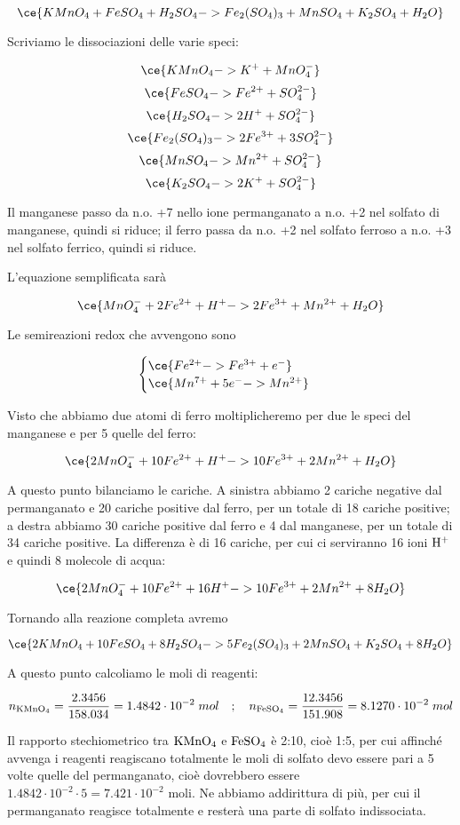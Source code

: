 $$\ce{KMnO_4 + FeSO_4 + H_2SO_4 -> Fe_2(SO_4)_3 + MnSO_4 + K_2SO_4 + H_2O}$$

Scriviamo le dissociazioni delle varie speci:

$$\ce{KMnO_4 -> K^+ + MnO_4^-}$$
$$\ce{FeSO_4 -> Fe^{2+} + SO_4^{2-}}$$
$$\ce{H_2SO_4 -> 2H^+ + SO_4^{2-}}$$
$$\ce{Fe_2(SO_4)_3 -> 2Fe^{3+} + 3SO_4^{2-}}$$
$$\ce{MnSO_4 -> Mn^{2+} + SO_4^{2-}}$$
$$\ce{K_2SO_4 -> 2K^+ + SO_4^{2-}}$$

Il manganese passo da n.o. +7 nello ione permanganato a n.o. +2 nel solfato di manganese, quindi si riduce; il ferro passa da n.o. +2 nel solfato ferroso a n.o. +3 nel solfato ferrico, quindi si riduce.

L'equazione semplificata sarà

$$\ce{MnO_4^- + 2Fe^{2+} + H^+ -> 2Fe^{3+} + Mn^{2+} + H_2O}$$

Le semireazioni redox che avvengono sono

$$\begin{cases}
    \ce{Fe^{2+} -> Fe^{3+} + e^-}\\
    \ce{Mn^{7+} + 5e^- -> Mn^{2+}}
\end{cases}$$

Visto che abbiamo due atomi di ferro moltiplicheremo per due le speci del manganese e per 5 quelle del ferro:

$$\ce{2MnO_4^- + 10Fe^{2+} + H^+ -> 10Fe^{3+} + 2Mn^{2+} + H_2O}$$

A questo punto bilanciamo le cariche. A sinistra abbiamo 2 cariche negative dal permanganato e 20 cariche positive dal ferro, per un totale di 18 cariche positive; a destra abbiamo 30 cariche positive dal ferro e 4 dal manganese, per un totale di 34 cariche positive. La differenza è di 16 cariche, per cui ci serviranno 16 ioni $\rm H^+$ e quindi 8 molecole di acqua:

$$\ce{2MnO_4^- + 10Fe^{2+} + 16H^+ -> 10Fe^{3+} + 2Mn^{2+} + 8H_2O}$$

Tornando alla reazione completa avremo

$$\ce{2KMnO_4 + 10FeSO_4 + 8H_2SO_4 -> 5Fe_2(SO_4)_3 + 2MnSO_4 + K_2SO_4 + 8H_2O}$$

A questo punto calcoliamo le moli di reagenti:

$$n_{\rm KMnO_4}=\frac{2.3456}{158.034}
=1.4842 \cdot 10^{-2}\;mol
\quad;\quad
n_{\rm FeSO_4}=\frac{12.3456}{151.908}
=8.1270 \cdot 10^{-2}\;mol$$

Il rapporto stechiometrico tra $\rm KMnO_4$ e $\rm FeSO_4$ è 2:10, cioè 1:5, per cui affinché avvenga i reagenti reagiscano totalmente le moli di solfato devo essere pari a 5 volte quelle del permanganato, cioè dovrebbero essere $1.4842 \cdot 10^{-2} \cdot 5=7.421 \cdot 10^{-2}$ moli. Ne abbiamo addirittura di più, per cui il permanganato reagisce totalmente e resterà una parte di solfato indissociata.

